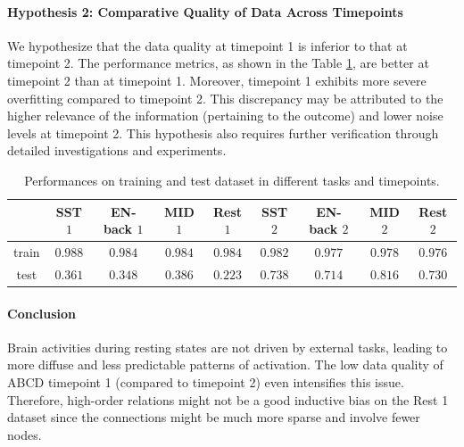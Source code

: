 \paragraph{Hypothesis 2: Comparative Quality of Data Across Timepoints}
We hypothesize that the data quality at timepoint 1 is inferior to that at timepoint 2. The performance metrics, as shown in the Table \ref{tab:train_test}, are better at timepoint 2 than at timepoint 1. Moreover, timepoint 1 exhibits more severe overfitting compared to timepoint 2. This discrepancy may be attributed to the higher relevance of the information (pertaining to the outcome) and lower noise levels at timepoint 2. This hypothesis also requires further verification through detailed investigations and experiments.
\begin{table}[H]
    \centering
    \begin{tabular}{c|cccccccc}
    \toprule
	&SST $1$ 	&EN-back $1$ 	&MID $1$ 	&Rest $1$ 	&SST $2$ 	&EN-back $2$ 	&MID $2$ 	&Rest $2$ \\
 \midrule
    train 	&$0.988$ 	&$0.984$ 	&$0.984$ 	&$0.984$ 	&$0.982$ 	&$0.977$ 	&$0.978$ 	&$0.976$ \\
test 	&$0.361$ 	&$0.348$ 	&$0.386$ 	&$0.223$ 	&$0.738$ 	&$0.714$ 	&$0.816$ 	&$0.730$\\
\bottomrule
    \end{tabular}
    \caption{Performances on training and test dataset in different tasks and timepoints.}
    \label{tab:train_test}
\end{table}

\paragraph{Conclusion}
Brain activities during resting states are not driven by external tasks, leading to more diffuse and less predictable patterns of activation. The low data quality of ABCD timepoint 1 (compared to timepoint 2) even intensifies this issue. Therefore, high-order relations might not be a good inductive bias on the Rest 1 dataset since the connections might be much more sparse and involve fewer nodes.

